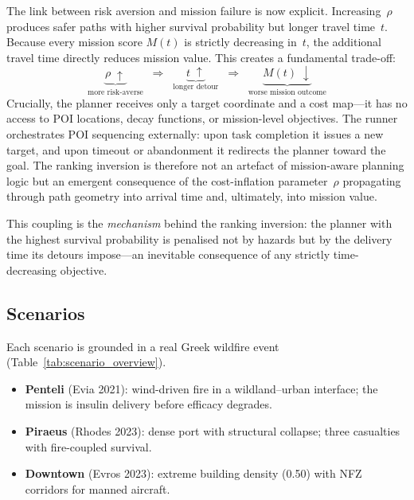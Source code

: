 \documentclass[drones,article,submit,moreauthors]{Definitions/mdpi}
\begin{document}
The link between risk aversion and mission failure is now explicit.
Increasing~$\rho$ produces safer paths with higher survival probability but
longer travel time~$t$. Because every mission score $M(t)$ is strictly
decreasing in~$t$, the additional travel time directly reduces mission
value. This creates a fundamental trade-off:
\begin{equation}\label{eq:coupling}
  \underbrace{\rho \;\uparrow}_{\text{more risk-averse}}
  \;\;\Longrightarrow\;\;
  \underbrace{t \;\uparrow}_{\text{longer detour}}
  \;\;\Longrightarrow\;\;
  \underbrace{M(t) \;\downarrow}_{\text{worse mission outcome}}
\end{equation}
Crucially, the planner receives only a target coordinate and
a cost map---it has no access to POI locations, decay functions,
or mission-level objectives. The runner orchestrates POI
sequencing externally: upon task completion it issues a new
target, and upon timeout or abandonment it redirects the
planner toward the goal. The ranking inversion is therefore
not an artefact of mission-aware planning logic but an
emergent consequence of the cost-inflation parameter~$\rho$
propagating through path geometry into arrival time and,
ultimately, into mission value.

This coupling is the \emph{mechanism} behind the ranking inversion: the
planner with the highest survival probability is penalised not by
hazards but by the delivery time its detours impose---an inevitable
consequence of any strictly time-decreasing objective.

\subsection{Scenarios}\label{sec:scenarios}

Each scenario is grounded in a real Greek wildfire event
(Table~\ref{tab:scenario_overview}).

\begin{itemize}[nosep,leftmargin=*]
  \item \textbf{Penteli} (Evia 2021): wind-driven fire in a wildland--urban
    interface; the mission is insulin delivery before efficacy degrades.
  \item \textbf{Piraeus} (Rhodes 2023): dense port with structural collapse;
    three casualties with fire-coupled survival.
  \item \textbf{Downtown} (Evros 2023): extreme building density (0.50) with
    NFZ corridors for manned aircraft.
\end{itemize}
\end{document}
